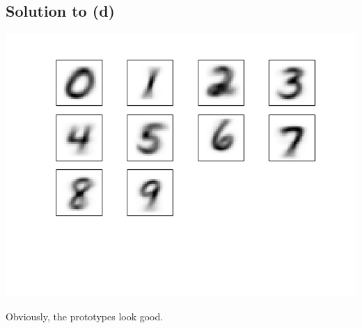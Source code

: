 \documentclass[10pt]{article}
\begin{document}
\subsection*{Solution to (d)}
\begin{center}
\includegraphics[scale=0.5]{MNISTPrototypes}
\end{center}
Obviously, the prototypes look good.
\end{document}

